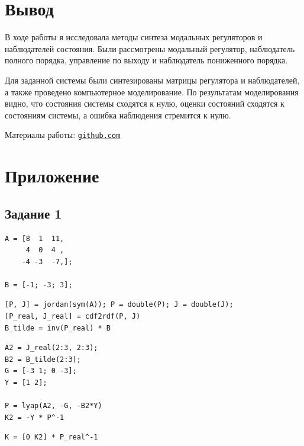 \documentclass[a4paper,12pt]{article}
\begin{document}
\newpage
\section{Вывод}

В ходе работы я исследовала методы синтеза модальных регуляторов и наблюдателей состояния. 
Были рассмотрены модальный регулятор, наблюдатель полного порядка, управление по выходу и 
наблюдатель пониженного порядка.

Для заданной системы были синтезированы матрицы регулятора и наблюдателей, а также 
проведено компьютерное моделирование. По результатам моделирования видно, что состояния 
системы сходятся к нулю, оценки состояний сходятся к состояниям системы, а ошибка наблюдения 
стремится к нулю.

Материалы работы: \href{https://github.com/decadeos/ITMO/tree/master/3_course/TAU/lab2}{\texttt{github.com}}








\newpage
\section{Приложение}

\subsection*{Задание 1}

\begin{lstlisting}[caption={Инициализация}]
A = [8  1  11,
	 4  0  4 ,
	-4 -3  -7,];

B = [-1; -3; 3];
\end{lstlisting}

\begin{lstlisting}[caption={Поиск вещественной Жордановой формы}, label={lst:jordan1}]
[P, J] = jordan(sym(A)); P = double(P); J = double(J);
[P_real, J_real] = cdf2rdf(P, J)
B_tilde = inv(P_real) * B
\end{lstlisting}

\begin{lstlisting}[caption={Решение уравнения Сильвестра}, label={lst:silv1}]
A2 = J_real(2:3, 2:3);
B2 = B_tilde(2:3);
G = [-3 1; 0 -3];
Y = [1 2];

P = lyap(A2, -G, -B2*Y)
K2 = -Y * P^-1
\end{lstlisting}

\begin{lstlisting}[caption={Перевод \(\hat K_c\) в исходный базис}, label={lst:origK11}]
K = [0 K2] * P_real^-1
\end{lstlisting}
\end{document}
